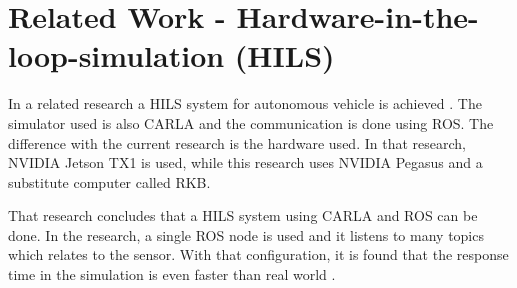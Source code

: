 \section{Related Work - Hardware-in-the-loop-simulation (HILS)}

In a related research a HILS system for autonomous vehicle is achieved
\cite{brogle_CarlaHILS}. The simulator used is also CARLA and the communication
is done using ROS. The difference with the current research is the hardware
used. In that research, NVIDIA Jetson TX1 is used, while this research uses
NVIDIA Pegasus and a substitute computer called RKB.

That research concludes that a HILS system using CARLA and ROS can be done. In
the research, a single ROS node is used and it listens to many topics which
relates to the sensor. With that configuration, it is found that the response
time in the simulation is even faster than real world \cite{brogle_CarlaHILS}.